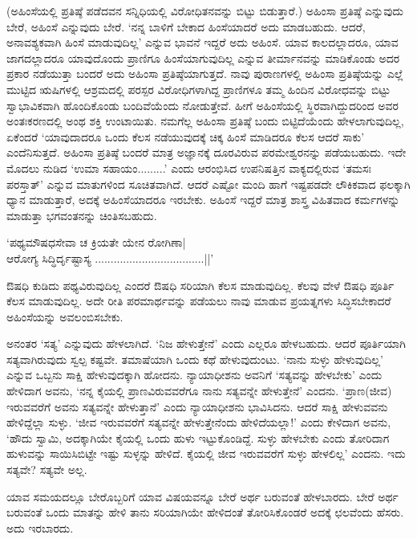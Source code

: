 (ಅಹಿಂಸೆಯಲ್ಲಿ ಪ್ರತಿಷ್ಠೆ ಪಡೆದವನ ಸನ್ನಿಧಿಯಲ್ಲಿ ವಿರೋಧಿತನವನ್ನು ಬಿಟ್ಟು ಬಿಡುತ್ತಾರೆ.) ಅಹಿಂಸಾ ಪ್ರತಿಷ್ಠೆ ಎನ್ನುವುದು ಬೇರೆ, ಅಹಿಂಸೆ ಎನ್ನುವುದು ಬೇರೆ. `ನನ್ನ ಬಾಳಿಗೆ ಬೇಕಾದ ಹಿಂಸೆಯಾದರೆ ಅದು ಮಾಡಬಹುದು. ಆದರೆ, ಅನಾವಶ್ಯಕವಾಗಿ ಹಿಂಸೆ ಮಾಡುವುದಿಲ್ಲ' ಎನ್ನುವ ಭಾವನೆ ಇದ್ದರೆ ಅದು ಅಹಿಂಸೆ. ಯಾವ ಕಾಲದಲ್ಲಾದರೂ, ಯಾವ ಜಾಗದಲ್ಲಾದರೂ ಯಾವುದೊಂದು ಪ್ರಾಣಿಗೂ ಹಿಂಸೆಯಾಗುವುದಿಲ್ಲ ಎನ್ನುವ ತೀರ್ಮಾನವನ್ನು ಮಾಡಿಕೊಂಡು ಅದರ ಪ್ರಕಾರ ನಡೆಯುತ್ತಾ ಬಂದರೆ ಅದು ಅಹಿಂಸಾ ಪ್ರತಿಷ್ಠೆಯಾಗುತ್ತದೆ. ನಾವು ಪುರಾಣಗಳಲ್ಲಿ ಅಹಿಂಸಾ ಪ್ರತಿಷ್ಠೆಯನ್ನು ಎಲ್ಲೆ ಮುಟ್ಟಿದ ಋಷಿಗಳಲ್ಲಿ ಆಶ್ರಮದಲ್ಲಿ ಪರಸ್ಪರ ವಿರೋಧಿಗಳಾಗಿದ್ದ ಪ್ರಾಣಿಗಳೂ ತಮ್ಮ ಹಿಂದಿನ ವಿರೋಧವನ್ನು ಬಿಟ್ಟು ಸ್ವಾಭಾವಿಕವಾಗಿ ಹೊಂದಿಕೊಂಡು ಬಂದಿವೆಯೆಂದು ನೋಡುತ್ತೇವೆ. ಹೀಗೆ ಅಹಿಂಸೆಯಲ್ಲಿ ಸ್ಥಿರವಾಗಿದ್ದುದರಿಂದ ಅವರ ಅಂತಃಕರಣದಲ್ಲಿ ಅಂಥ ಶಕ್ತಿ ಉಂಟಾಯಿತು. ನಮಗೆಲ್ಲ ಅಹಿಂಸಾ ಪ್ರತಿಷ್ಠೆ ಬಂದು ಬಿಟ್ಟಿದೆಯೆಂದು ಹೇಳಲಾಗುವುದಿಲ್ಲ, ಏಕೆಂದರೆ `ಯಾವುದಾದರೂ ಒಂದು ಕೆಲಸ ನಡೆಯುವುದಕ್ಕೆ ಚಿಕ್ಕ ಹಿಂಸೆ ಮಾಡಿದರೂ ಕೆಲಸ ಆದರೆ ಸಾಕು' ಎಂದೆನಿಸುತ್ತದೆ. ಅಹಿಂಸಾ ಪ್ರತಿಷ್ಠೆ ಬಂದರೆ ಮಾತ್ರ ಅಜ್ಞಾನಕ್ಕೆ ದೂರವಿರುವ ಪರಮೇಶ್ವರನನ್ನು ಪಡೆಯಬಹುದು. ಇದೇ ಮೊದಲು ನುಡಿದ `ಉಮಾ ಸಹಾಯಂ.........' ಎಂದು ಆರಂಭಿಸಿದ ಉಪನಿಷತ್ತಿನ ವಾಕ್ಯದಲ್ಲಿರುವ `ತಮಸಃ ಪರಸ್ತಾತ್' ಎನ್ನುವ ಮಾತುಗಳಿಂದ ಸೂಚಿತವಾಗಿದೆ. ಆದರೆ ಎಷ್ಟೋ ಮಂದಿ ಹಾಗೆ ಇಷ್ಟಪಡದೇ ಲೌಕಿಕವಾದ ಫಲಕ್ಕಾಗಿ ಧ್ಯಾನ ಮಾಡುತ್ತಾರೆ, ಅದಕ್ಕೆ ಅಹಿಂಸೆಯಾದರೂ ಇರಬೇಕು. ಅಹಿಂಸೆ ಇದ್ದರೆ ಮಾತ್ರ ಶಾಸ್ತ್ರ ವಿಹಿತವಾದ ಕರ್ಮಗಳನ್ನು ಮಾಡುತ್ತಾ ಭಗವಂತನನ್ನು ಚಿಂತಿಸಬಹುದು.

\begin{shloka}
`ಪಥ್ಯಮೌಷಧಸೇವಾ ಚ ಕ್ರಿಯತೇ ಯೇನ ರೋಗಿಣಾ|\\
ಆರೋಗ್ಯ ಸಿದ್ಧಿರ್ದೃಷ್ಟಾಸ್ಯ ...................................||'
\end{shloka}

ಔಷಧಿ ಕುಡಿದು ಪಥ್ಯವಿರುವುದಿಲ್ಲ ಎಂದರೆ ಔಷಧಿ ಸರಿಯಾಗಿ ಕೆಲಸ ಮಾಡುವುದಿಲ್ಲ. ಕೆಲವು ವೇಳೆ ಔಷಧಿ ಪೂರ್ತಿ ಕೆಲಸ ಮಾಡುವುದಿಲ್ಲ. ಅದೇ ರೀತಿ ಪರಮಾರ್ಥವನ್ನು ಪಡೆಯಲು ನಾವು ಮಾಡುವ ಪ್ರಯತ್ನಗಳು ಸಿದ್ಧಿಸಬೇಕಾದರೆ ಅಹಿಂಸೆಯನ್ನು ಅವಲಂಬಿಸಬೇಕು.

ಅನಂತರ `ಸತ್ಯ' ಎನ್ನುವುದು ಹೇಳಲಾಗಿದೆ. `ನಿಜ ಹೇಳುತ್ತೇನೆ' ಎಂದು ಎಲ್ಲರೂ ಹೇಳಬಹುದು. ಆದರೆ ಪೂರ್ತಿಯಾಗಿ ಸತ್ಯವಾಗಿರುವುದು ಸ್ವಲ್ಪ ಕಷ್ಟವೇ. ತಮಾಷೆಯಾಗಿ ಒಂದು ಕಥೆ ಹೇಳುವುದುಂಟು. `ನಾನು ಸುಳ್ಳು ಹೇಳುವುದಿಲ್ಲ' ಎನ್ನುವ ಒಬ್ಬನು ಸಾಕ್ಷಿ ಹೇಳುವುದಕ್ಕಾಗಿ ಹೋದನು. ನ್ಯಾಯಾಧೀಶನು ಅವನಿಗೆ `ಸತ್ಯವನ್ನು ಹೇಳಬೇಕು' ಎಂದು ಹೇಳಿದಾಗ ಅವನು, `ನನ್ನ ಕೈಯಲ್ಲಿ ಪ್ರಾಣವಿರುವವರೆಗೂ ನಾನು ಸತ್ಯವನ್ನೇ ಹೇಳುತ್ತೇನೆ' ಎಂದನು. `ಪ್ರಾಣ(ಜೀವ) ಇರುವವರೆಗೆ ಅವನು ಸತ್ಯವನ್ನೇ ಹೇಳುತ್ತಾನೆ' ಎಂದು ನ್ಯಾಯಾಧೀಶನು ಭಾವಿಸಿದನು. ಆದರೆ ಸಾಕ್ಷಿ ಹೇಳುವವನು ಹೇಳಿದ್ದೆಲ್ಲಾ ಸುಳ್ಳು. `ಜೀವ ಇರುವವರೆಗೆ ಸತ್ಯವನ್ನೇ ಹೇಳುತ್ತೇನೆಂದು ಹೇಳಿದೆಯಲ್ಲಾ!' ಎಂದು ಕೇಳಿದಾಗ ಅವನು, `ಹೌದು ಸ್ವಾಮಿ, ಅದಕ್ಕಾಗಿಯೇ ಕೈಯಲ್ಲಿ ಒಂದು ಹುಳು ಇಟ್ಟುಕೊಂಡಿದ್ದೆ. ಸುಳ್ಳು ಹೇಳಬೇಕು ಎಂದು ತೋರಿದಾಗ ಹುಳುವನ್ನು ಸಾಯಿಸಿಬಿಟ್ಟೇ ಇಷ್ಟು ಸುಳ್ಳನ್ನು ಹೇಳಿದೆ. ಕೈಯಲ್ಲಿ ಜೀವ ಇರುವವರೆಗೆ ಸುಳ್ಳು ಹೇಳಲಿಲ್ಲ' ಎಂದನು. ಇದು ಸತ್ಯವೇ? ಸತ್ಯವೇ ಅಲ್ಲ.

ಯಾವ ಸಮಯದಲ್ಲೂ ಬೇರೊಬ್ಬರಿಗೆ ಯಾವ ವಿಷಯವನ್ನೂ ಬೇರೆ ಅರ್ಥ ಬರುವಂತೆ ಹೇಳಬಾರದು. ಬೇರೆ ಅರ್ಥ ಬರುವಂತೆ ಒಂದು ಮಾತನ್ನು ಹೇಳಿ ತಾನು ಸರಿಯಾಗಿಯೇ ಹೇಳಿದಂತೆ ತೋರಿಸಿಕೊಂಡರೆ ಅದಕ್ಕೆ ಛಲವೆಂದು ಹೆಸರು. ಅದು ಇರಬಾರದು.

